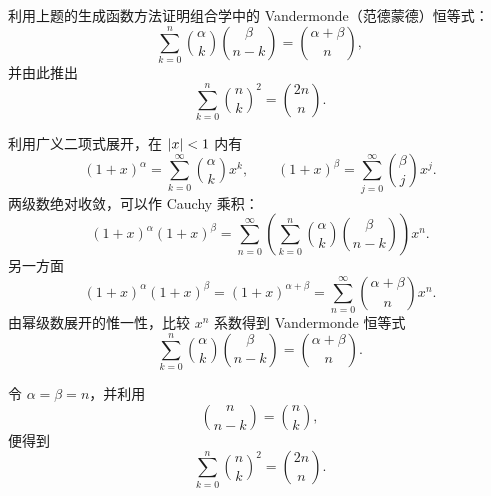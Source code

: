 \begin{xreferenceproblem}[15]
利用上题的生成函数方法证明组合学中的 Vandermonde（范德蒙德）恒等式：
  \[
    \sum_{k=0}^{n}{\alpha\choose k}{\beta\choose n-k}={\alpha+\beta\choose n},
  \]
  并由此推出
  \[
    \sum_{k=0}^{n}{n\choose k}^2={2n\choose n}.
  \]
\end{xreferenceproblem}
\begin{xsolution}
利用广义二项式展开，在 $\lvert x\rvert<1$ 内有
\[
  (1+x)^\alpha
  =\sum_{k=0}^{\infty}{\alpha\choose k}x^k,
  \qquad
  (1+x)^\beta
  =\sum_{j=0}^{\infty}{\beta\choose j}x^j.
\]
两级数绝对收敛，可以作 Cauchy 乘积：
\[
  (1+x)^\alpha(1+x)^\beta
  =\sum_{n=0}^{\infty}
  \left(\sum_{k=0}^{n}{\alpha\choose k}{\beta\choose n-k}\right)x^n.
\]
另一方面
\[
  (1+x)^\alpha(1+x)^\beta=(1+x)^{\alpha+\beta}
  =\sum_{n=0}^{\infty}{\alpha+\beta\choose n}x^n.
\]
由幂级数展开的惟一性，比较 $x^n$ 系数得到 Vandermonde 恒等式
\[
  \boxed{
  \sum_{k=0}^{n}{\alpha\choose k}{\beta\choose n-k}
  ={\alpha+\beta\choose n}}.
\]

令 $\alpha=\beta=n$，并利用
\[
  {n\choose n-k}={n\choose k},
\]
便得到
\[
  \boxed{
  \sum_{k=0}^{n}{n\choose k}^2={2n\choose n}}.
\]
\end{xsolution}


